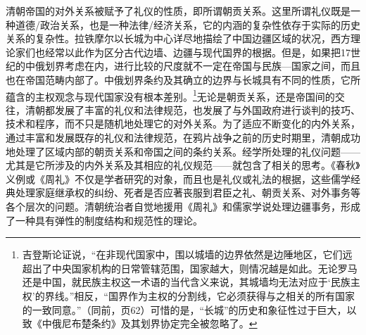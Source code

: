 \documentclass[a4paper, 12pt, openright]{ctexbook}
\begin{document}
清朝帝国的对外关系被赋予了礼仪的性质，即所谓朝贡关系。这里所谓礼仪既是一种道德/政治关系，也是一种法律/经济关系，它的内涵的复杂性依存于实际的历史关系的复杂性。拉铁摩尔以长城为中心详尽地描绘了中国边疆区域的状况，西方理论家们也经常以此作为区分古代边墙、边疆与现代国界的根据。但是，如果把17世纪的中俄划界考虑在内，进行比较的尺度就不一定在帝国与民族—国家之间，而且也在帝国范畴内部了。中俄划界条约及其确立的边界与长城具有不同的性质，它所蕴含的主权观念与现代国家没有根本差别。\footnote{吉登斯论证说，“在非现代国家中，围以城墙的边界依然是边陲地区，它们远超出了中央国家机构的日常管辖范围，国家越大，则情况越是如此。无论罗马还是中国，就民族主权这一术语的当代含义来说，其城墙均无法对应于‘民族主权’的界线。”相反，“国界作为主权的分割线，它必须获得与之相关的所有国家的一致同意。”（同前，页62）可惜的是，“长城”的历史和象征性过于巨大，以致《中俄尼布楚条约》及其划界协定完全被忽略了。}无论是朝贡关系，还是帝国间的交往，清朝都发展了丰富的礼仪和法律规范，也发展了与外国政府进行谈判的技巧、技术和程序，而不只是随机地处理它的对外关系。为了适应不断变化的内外关系，通过丰富和发展既存的礼仪和法律规范，在鸦片战争之前的历史时期里，清朝成功地处理了区域内部的朝贡关系和帝国之间的条约关系。经学所处理的礼仪问题——尤其是它所涉及的内外关系及其相应的礼仪规范——就包含了相关的思考。《春秋》义例或《周礼》不仅是学者研究的对象，而且也是礼仪或礼法的根据，这些儒学经典处理家庭继承权的纠纷、死者是否应著丧服到君臣之礼、朝贡关系、对外事务等各个层次的问题。清朝统治者自觉地援用《周礼》和儒家学说处理边疆事务，形成了一种具有弹性的制度结构和规范性的理论。
\end{document}
